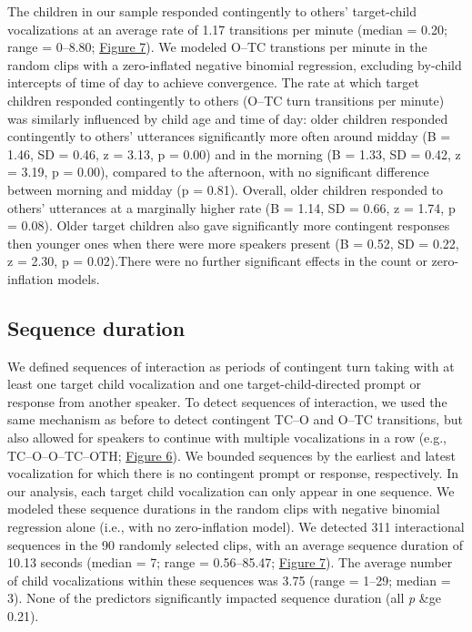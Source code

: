\documentclass[floatsintext,man]{apa6}
\theoremstyle{definition}
\theoremstyle{definition}
\theoremstyle{definition}
\theoremstyle{remark}
\begin{document}
The children in our sample responded contingently to others'
target-child vocalizations at an average rate of 1.17 transitions per
minute (median = 0.20; range = 0--8.80; \protect\hyperlink{fig7}{Figure
7}). We modeled O--TC transtions per minute in the random clips with a
zero-inflated negative binomial regression, excluding by-child
intercepts of time of day to achieve convergence. The rate at which
target children responded contingently to others (O--TC turn transitions
per minute) was similarly influenced by child age and time of day: older
children responded contingently to others' utterances significantly more
often around midday (B = 1.46, SD = 0.46, z = 3.13, p = 0.00) and in the
morning (B = 1.33, SD = 0.42, z = 3.19, p = 0.00), compared to the
afternoon, with no significant difference between morning and midday (p
= 0.81). Overall, older children responded to others' utterances at a
marginally higher rate (B = 1.14, SD = 0.66, z = 1.74, p = 0.08). Older
target children also gave significantly more contingent responses then
younger ones when there were more speakers present (B = 0.52, SD = 0.22,
z = 2.30, p = 0.02).There were no further significant effects in the
count or zero-inflation models.

\subsection{Sequence duration}\label{sequence-duration}

We defined sequences of interaction as periods of contingent turn taking
with at least one target child vocalization and one
target-child-directed prompt or response from another speaker. To detect
sequences of interaction, we used the same mechanism as before to detect
contingent TC--O and O--TC transitions, but also allowed for speakers to
continue with multiple vocalizations in a row (e.g., TC--O--O--TC--OTH;
\protect\hyperlink{fig6}{Figure 6}). We bounded sequences by the
earliest and latest vocalization for which there is no contingent prompt
or response, respectively. In our analysis, each target child
vocalization can only appear in one sequence. We modeled these sequence
durations in the random clips with negative binomial regression alone
(i.e., with no zero-inflation model). We detected 311 interactional
sequences in the 90 randomly selected clips, with an average sequence
duration of 10.13 seconds (median = 7; range = 0.56--85.47;
\protect\hyperlink{fig7}{Figure 7}). The average number of child
vocalizations within these sequences was 3.75 (range = 1--29; median =
3). None of the predictors significantly impacted sequence duration (all
\emph{p} \&ge 0.21).
\end{document}
